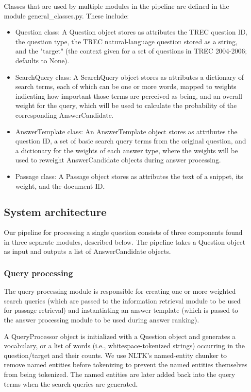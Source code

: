 \documentclass[11pt]{article}
\begin{document}
Classes that are used by multiple modules in the pipeline are defined in the module general\_classes.py. These include:

\begin{itemize}
\item Question class: A Question object stores as attributes the TREC question ID, the question type, the TREC natural-language question stored as a string, and the "target" (the context given for a set of questions in TREC 2004-2006; defaults to None).
\item SearchQuery class: A SearchQuery object stores as attributes a dictionary of search terms, each of which can be one or more words, mapped to weights indicating how important those terms are perceived as being, and an overall weight for the query, which will be used to calculate the probability of the corresponding AnswerCandidate.
\item AnswerTemplate class: An AnswerTemplate object stores as attributes the question ID, a set of basic search query terms from the original question, and a dictionary for the weights of each answer type, where the weights will be used to reweight AnswerCandidate objects during answer processing.
\item Passage class: A Passage object stores as attributes the text of a snippet, its weight, and the document ID.
\end{itemize}

\subsection{System architecture}

Our pipeline for processing a single question consists of three components found in three separate modules, described below. The pipeline takes a Question object as input and outputs a list of AnswerCandidate objects.

\subsubsection{Query processing}

The query processing module is responsible for creating one or more weighted search queries (which are passed to the information retrieval module to be used for passage retrieval) and instantiating an answer template (which is passed to the answer processing module to be used during answer ranking).

A QueryProcessor object is initialized with a Question object and generates a vocabulary, or a list of words (i.e., whitespace-tokenized strings) occurring in the question/target and their counts. We use NLTK's named-entity chunker to remove named entities before tokenizing to prevent the named entities themselves from being tokenized. The named entities are later added back into the query terms when the search queries are generated.
\end{document}
